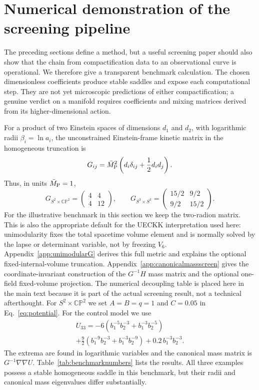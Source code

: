 \documentclass[aps,prd,twocolumn,superscriptaddress,nofootinbib,longbibliography,floatfix]{revtex4-2}
\newcommand{\Mpl}{\bar M_{\rm P}}
\newcommand{\CP}{\mathbb{CP}}
\begin{document}
\section{Numerical demonstration of the screening pipeline}
\label{sec:numericaldemo}
The preceding sections define a method, but a useful screening paper should also show that the chain from compactification data to an observational curve is operational. We therefore give a transparent benchmark calculation. The chosen dimensionless coefficients produce stable saddles and expose each computational step. They are not yet microscopic predictions of either compactification; a genuine verdict on a manifold requires coefficients and mixing matrices derived from its higher-dimensional action.

For a product of two Einstein spaces of dimensions $d_1$ and $d_2$, with logarithmic radii $\beta_i=\ln a_i$, the unconstrained Einstein-frame kinetic matrix in the homogeneous truncation is
\begin{equation}
G_{ij}=\Mpl^2\left(d_i\delta_{ij}+\frac12 d_i d_j\right).
\label{eq:kineticmatrixbenchmark}
\end{equation}
Thus, in units $\Mpl=1$,
\begin{equation}
G_{S^2\times\CP^2}=\begin{pmatrix}4&4\\4&12\end{pmatrix},\qquad
G_{S^3\times S^3}=\begin{pmatrix}15/2&9/2\\9/2&15/2\end{pmatrix}.
\end{equation}
For the illustrative benchmark in this section we keep the two-radion matrix. This is also the appropriate default for the UECKK interpretation used here: unimodularity fixes the total spacetime volume element and is normally solved by the lapse or determinant variable, not by freezing $V_6$. Appendix~\ref{app:unimodularG} derives this full metric and explains the optional fixed-internal-volume truncation. Appendix~\ref{app:canonicalmassscreen} gives the coordinate-invariant construction of the $G^{-1}H$ mass matrix and the optional one-field fixed-volume projection. The numerical decoupling table is placed here in the main text because it is part of the actual screening result, not a technical afterthought.
For $S^2\times\CP^2$ we set $A=B=q=1$ and $C=0.05$ in Eq.~\eqref{eq:potential}. For the control model we use
\begin{multline}
U_{33}=-6\left(b_1^{-5}b_2^{-3}+b_1^{-3}b_2^{-5}\right)\\
+\frac92\left(b_1^{-9}b_2^{-3}+b_1^{-3}b_2^{-9}\right)
+0.2\,b_1^{-3}b_2^{-3}.
\label{eq:s3benchmarkpotential}
\end{multline}
The extrema are found in logarithmic variables and the canonical mass matrix is $G^{-1}\nabla\nabla U$. Table~\ref{tab:benchmarknumbers} lists the results. All three examples possess a stable homogeneous saddle in this benchmark, but their radii and canonical mass eigenvalues differ substantially.
\end{document}
